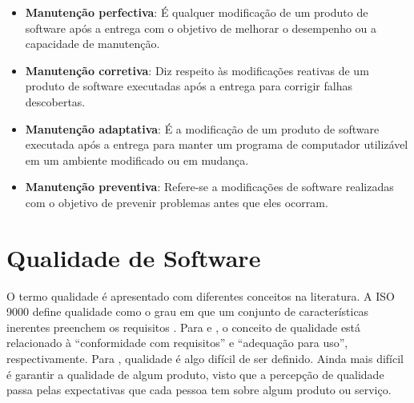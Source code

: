 \begin{itemize}
   
    \item \textbf{Manutenção perfectiva}: É qualquer modificação de um produto de software após a entrega com o objetivo de melhorar o desempenho ou a capacidade de manutenção.
   
    \item \textbf{Manutenção corretiva}: Diz respeito às modificações reativas de um produto de software executadas após a entrega para corrigir falhas descobertas.
   
    \item \textbf{Manutenção adaptativa}: É a modificação de um produto de software executada após a entrega para manter um programa de computador utilizável em um ambiente modificado ou em mudança.
   
    \item \textbf{Manutenção preventiva}: Refere-se a modificações de software realizadas com o objetivo de prevenir problemas antes que eles ocorram.

\end{itemize}


\section{Qualidade de Software}\label{sec:qualidadedesoftware}


O termo qualidade é apresentado com diferentes conceitos na literatura. A ISO 9000 define qualidade como o grau
em que um conjunto de características inerentes preenchem os requisitos \cite{iso9000}. Para  e , o conceito de qualidade está relacionado à ``conformidade com requisitos'' e ``adequação para
uso'', respectivamente. Para , qualidade é algo difícil de ser definido. Ainda mais difícil é garantir a qualidade de algum produto, visto que a percepção de qualidade passa pelas expectativas que cada pessoa tem sobre algum produto ou serviço. %

